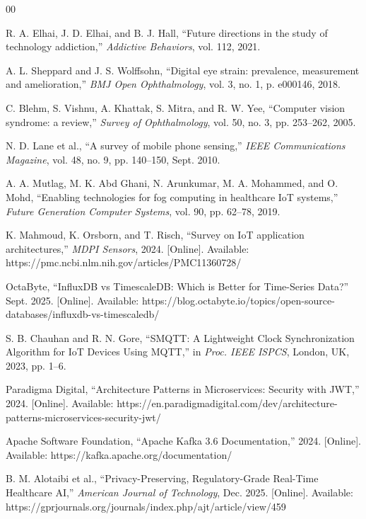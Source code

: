 \documentclass[conference]{IEEEtran}
\begin{document}
\begin{thebibliography}{00}

R. A. Elhai, J. D. Elhai, and B. J. Hall,
``Future directions in the study of technology addiction,''
\textit{Addictive Behaviors}, vol. 112, 2021.

A. L. Sheppard and J. S. Wolffsohn,
``Digital eye strain: prevalence, measurement and amelioration,''
\textit{BMJ Open Ophthalmology}, vol. 3, no. 1, p. e000146, 2018.

C. Blehm, S. Vishnu, A. Khattak, S. Mitra, and R. W. Yee,
``Computer vision syndrome: a review,''
\textit{Survey of Ophthalmology}, vol. 50, no. 3, pp. 253--262, 2005.

N. D. Lane et al.,
``A survey of mobile phone sensing,''
\textit{IEEE Communications Magazine}, vol. 48, no. 9, pp. 140--150, Sept. 2010.

A. A. Mutlag, M. K. Abd Ghani, N. Arunkumar, M. A. Mohammed, and O. Mohd,
``Enabling technologies for fog computing in healthcare IoT systems,''
\textit{Future Generation Computer Systems}, vol. 90, pp. 62--78, 2019.

K. Mahmoud, K. Orsborn, and T. Risch,
``Survey on IoT application architectures,''
\textit{MDPI Sensors}, 2024. [Online].
Available: https://pmc.ncbi.nlm.nih.gov/articles/PMC11360728/

OctaByte,
``InfluxDB vs TimescaleDB: Which is Better for Time-Series Data?''
Sept. 2025. [Online].
Available: https://blog.octabyte.io/topics/open-source-databases/influxdb-vs-timescaledb/

S. B. Chauhan and R. N. Gore,
``SMQTT: A Lightweight Clock Synchronization Algorithm for IoT Devices Using MQTT,''
in \textit{Proc. IEEE ISPCS}, London, UK, 2023, pp. 1--6.

Paradigma Digital,
``Architecture Patterns in Microservices: Security with JWT,'' 2024. [Online].
Available: https://en.paradigmadigital.com/dev/architecture-patterns-microservices-security-jwt/

Apache Software Foundation,
``Apache Kafka 3.6 Documentation,'' 2024. [Online].
Available: https://kafka.apache.org/documentation/

B. M. Alotaibi et al.,
``Privacy-Preserving, Regulatory-Grade Real-Time Healthcare AI,''
\textit{American Journal of Technology}, Dec. 2025. [Online].
Available: https://gprjournals.org/journals/index.php/ajt/article/view/459


\end{thebibliography}
\end{document}
